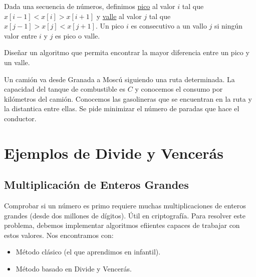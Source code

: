 \begin{ejercicio*}
    Dada una secuencia de números, definimos \ul{pico} al valor $i$ tal que $x[i-1] < x[i] > x[i+1]$ y \ul{valle} al valor $j$ tal que $x[j-1]>x[j]<x[j+1]$. Un pico $i$ es consecutivo a un vallo $j$ si ningún valor entre $i$ y $j$ es pico o valle.

    Diseñar un algoritmo que permita encontrar la mayor diferencia entre un pico y un valle.
\end{ejercicio*}

\begin{ejercicio*}
    Un camión va desde Granada a Moscú siguiendo una ruta determinada. La capacidad del tanque de combustible es $C$ y conocemos el consumo por kilómetros del camión. Conocemos las gasolineras que se encuentran en la ruta y la distantica entre ellas. Se pide minimizar el número de paradas que hace el conductor.
\end{ejercicio*}

\section{Ejemplos de Divide y Vencerás}
\subsection{Multiplicación de Enteros Grandes}
Comprobar si un número es primo requiere muchas multiplicaciones de enteros grandes (desde dos millones de dígitos). Útil en criptografía. Para resolver este problema, debemos implementar algoritmos efiientes capaces de trabajar con estos valores. Nos encontramos con:
\begin{itemize}
    \item Método clásico (el que aprendimos en infantil).
    \item Método basado en Divide y Vencerás.
\end{itemize}

